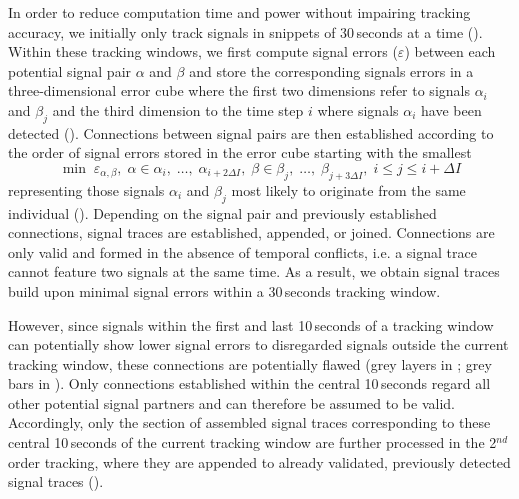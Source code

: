 In order to reduce computation time and power without impairing tracking accuracy, we initially only track signals in snippets of 30\,seconds at a time (). Within these tracking windows, we first compute signal errors ($\varepsilon$) between each potential signal pair $\alpha$ and $\beta$ and store the corresponding signals errors in a three-dimensional error cube where the first two dimensions refer to signals $\alpha_i$ and $\beta_j$ and the third dimension to the time step $i$ where signals $\alpha_i$ have been detected (). Connections between signal pairs are then established according to the order of signal errors stored in the error cube starting with the smallest 
\begin{equation}\label{min_e_signal_connect}
  \min \; \varepsilon_{\alpha, \beta}, \; \alpha \in \alpha_i,\;\dots,\;\alpha_{i + 2\Delta I}, \; \beta \in \beta_j,\;\dots,\;\beta_{j + 3\Delta I}, \; i \leq j \leq i + \Delta I  
\end{equation}
representing those signals $\alpha_i$ and $\beta_j$ most likely to originate from the same individual (). Depending on the signal pair and previously established connections, signal traces are established, appended, or joined. Connections are only valid and formed in the absence of temporal conflicts, i.e. a signal trace cannot feature two signals at the same time. As a result, we obtain signal traces build upon minimal signal errors within a 30\,seconds tracking window. 

However, since signals within the first and last 10\,seconds of a tracking window can potentially show lower signal errors to disregarded signals outside the current tracking window, these connections are potentially flawed (grey layers in ; grey bars in ). Only connections established within the central 10\,seconds regard all other potential signal partners and can therefore be assumed to be valid. Accordingly, only the section of assembled signal traces corresponding to these central 10\,seconds of the current tracking window are further processed in the 2$^{nd}$ order tracking, where they are appended to already validated, previously detected signal traces (). 

